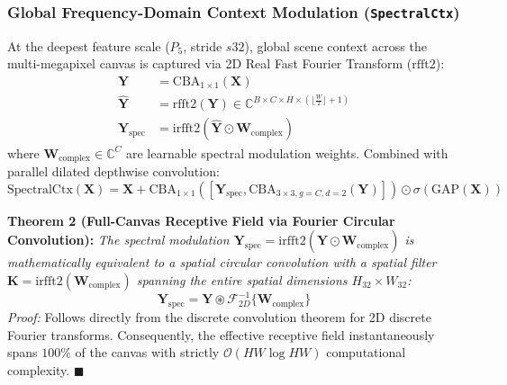 \documentclass[11pt,a4paper]{article}
\begin{document}
\subsubsection{Global Frequency-Domain Context Modulation (\texttt{SpectralCtx})}
At the deepest feature scale ($P_5$, stride $s32$), global scene context across the multi-megapixel canvas is captured via 2D Real Fast Fourier Transform ($\text{rfft2}$):
\begin{align}
\mathbf{Y} &= \text{CBA}_{1\times 1}(\mathbf{X}) \\
\widehat{\mathbf{Y}} &= \text{rfft2}(\mathbf{Y}) \in \mathbb{C}^{B \times C \times H \times \left(\lfloor \frac{W}{2} \rfloor + 1\right)} \\
\mathbf{Y}_{\text{spec}} &= \text{irfft2}\left(\widehat{\mathbf{Y}} \odot \mathbf{W}_{\text{complex}}\right)
\end{align}
where $\mathbf{W}_{\text{complex}} \in \mathbb{C}^C$ are learnable spectral modulation weights. Combined with parallel dilated depthwise convolution:
\begin{equation}
\text{SpectralCtx}(\mathbf{X}) = \mathbf{X} + \text{CBA}_{1\times 1}\left(\left[\mathbf{Y}_{\text{spec}}, \text{CBA}_{3\times 3, g=C, d=2}(\mathbf{Y})\right]\right) \odot \sigma\left(\text{GAP}(\mathbf{X})\right)
\end{equation}

\noindent\textbf{Theorem 2 (Full-Canvas Receptive Field via Fourier Circular Convolution):} \textit{The spectral modulation $\mathbf{Y}_{\text{spec}} = \text{irfft2}(\widehat{\mathbf{Y}} \odot \mathbf{W}_{\text{complex}})$ is mathematically equivalent to a spatial circular convolution with a spatial filter $\mathbf{K} = \text{irfft2}(\mathbf{W}_{\text{complex}})$ spanning the entire spatial dimensions $H_{32} \times W_{32}$:}
\begin{equation}
\mathbf{Y}_{\text{spec}} = \mathbf{Y} \circledast \mathcal{F}_{2D}^{-1}\{\mathbf{W}_{\text{complex}}\}
\end{equation}
\textit{Proof:} Follows directly from the discrete convolution theorem for 2D discrete Fourier transforms. Consequently, the effective receptive field instantaneously spans $100\%$ of the canvas with strictly $\mathcal{O}(HW \log HW)$ computational complexity. \hfill $\blacksquare$
\end{document}
